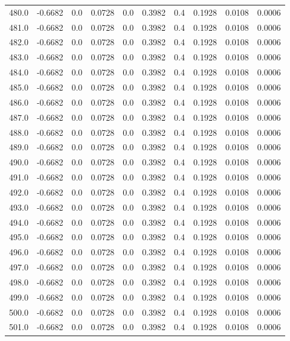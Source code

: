 \begin{longtable}{lrrrrrrrrr}
480.0 & -0.6682 & 0.0 & 0.0728 & 0.0 & 0.3982 & 0.4 & 0.1928 & 0.0108 & 0.0006 \\
481.0 & -0.6682 & 0.0 & 0.0728 & 0.0 & 0.3982 & 0.4 & 0.1928 & 0.0108 & 0.0006 \\
482.0 & -0.6682 & 0.0 & 0.0728 & 0.0 & 0.3982 & 0.4 & 0.1928 & 0.0108 & 0.0006 \\
483.0 & -0.6682 & 0.0 & 0.0728 & 0.0 & 0.3982 & 0.4 & 0.1928 & 0.0108 & 0.0006 \\
484.0 & -0.6682 & 0.0 & 0.0728 & 0.0 & 0.3982 & 0.4 & 0.1928 & 0.0108 & 0.0006 \\
485.0 & -0.6682 & 0.0 & 0.0728 & 0.0 & 0.3982 & 0.4 & 0.1928 & 0.0108 & 0.0006 \\
486.0 & -0.6682 & 0.0 & 0.0728 & 0.0 & 0.3982 & 0.4 & 0.1928 & 0.0108 & 0.0006 \\
487.0 & -0.6682 & 0.0 & 0.0728 & 0.0 & 0.3982 & 0.4 & 0.1928 & 0.0108 & 0.0006 \\
488.0 & -0.6682 & 0.0 & 0.0728 & 0.0 & 0.3982 & 0.4 & 0.1928 & 0.0108 & 0.0006 \\
489.0 & -0.6682 & 0.0 & 0.0728 & 0.0 & 0.3982 & 0.4 & 0.1928 & 0.0108 & 0.0006 \\
490.0 & -0.6682 & 0.0 & 0.0728 & 0.0 & 0.3982 & 0.4 & 0.1928 & 0.0108 & 0.0006 \\
491.0 & -0.6682 & 0.0 & 0.0728 & 0.0 & 0.3982 & 0.4 & 0.1928 & 0.0108 & 0.0006 \\
492.0 & -0.6682 & 0.0 & 0.0728 & 0.0 & 0.3982 & 0.4 & 0.1928 & 0.0108 & 0.0006 \\
493.0 & -0.6682 & 0.0 & 0.0728 & 0.0 & 0.3982 & 0.4 & 0.1928 & 0.0108 & 0.0006 \\
494.0 & -0.6682 & 0.0 & 0.0728 & 0.0 & 0.3982 & 0.4 & 0.1928 & 0.0108 & 0.0006 \\
495.0 & -0.6682 & 0.0 & 0.0728 & 0.0 & 0.3982 & 0.4 & 0.1928 & 0.0108 & 0.0006 \\
496.0 & -0.6682 & 0.0 & 0.0728 & 0.0 & 0.3982 & 0.4 & 0.1928 & 0.0108 & 0.0006 \\
497.0 & -0.6682 & 0.0 & 0.0728 & 0.0 & 0.3982 & 0.4 & 0.1928 & 0.0108 & 0.0006 \\
498.0 & -0.6682 & 0.0 & 0.0728 & 0.0 & 0.3982 & 0.4 & 0.1928 & 0.0108 & 0.0006 \\
499.0 & -0.6682 & 0.0 & 0.0728 & 0.0 & 0.3982 & 0.4 & 0.1928 & 0.0108 & 0.0006 \\
500.0 & -0.6682 & 0.0 & 0.0728 & 0.0 & 0.3982 & 0.4 & 0.1928 & 0.0108 & 0.0006 \\
501.0 & -0.6682 & 0.0 & 0.0728 & 0.0 & 0.3982 & 0.4 & 0.1928 & 0.0108 & 0.0006 \\

\end{longtable}
